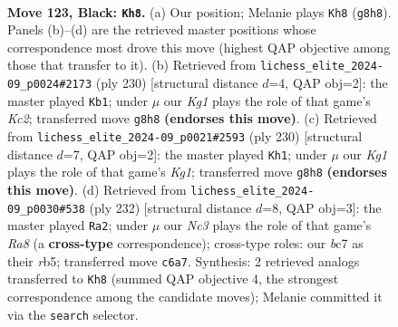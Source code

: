 \documentclass[11pt]{article}
\begin{document}
\clearpage

\begin{figure}[p]\centering
\begin{subfigure}{0.46\textwidth}\centering
\resizebox{\linewidth}{!}{%
\newchessgame
\chessboard[
  setfen={6k1/2B5/2n5/5PK1/8/8/4b3/8 b - - 4 123},
  showmover=false,
  pgfstyle=straightmove, color=movearrow, markmove={g8-h8}
]}
\caption{}
\end{subfigure}\hfill
\begin{subfigure}{0.46\textwidth}\centering
\resizebox{\linewidth}{!}{%
\newchessgame
\chessboard[
  setfen={8/8/8/8/8/b4pk1/2K5/5B2 w - - 0 116},
  showmover=false,
  pgfstyle=straightmove, color=movearrow, markmove={c2-b1}
]}
\caption{}
\end{subfigure}
\\[4pt]
\begin{subfigure}{0.46\textwidth}\centering
\resizebox{\linewidth}{!}{%
\newchessgame
\chessboard[
  setfen={8/8/8/4b3/6kp/8/8/6K1 w - - 30 116},
  showmover=false,
  pgfstyle=straightmove, color=movearrow, markmove={g1-h1}
]}
\caption{}
\end{subfigure}\hfill
\begin{subfigure}{0.46\textwidth}\centering
\resizebox{\linewidth}{!}{%
\newchessgame
\chessboard[
  setfen={R7/8/8/1r6/4K1k1/7p/7B/8 w - - 24 117},
  showmover=false,
  pgfstyle=straightmove, color=movearrow, markmove={a8-a2}
]}
\caption{}
\end{subfigure}
\caption{\textbf{Move 123, Black: \texttt{Kh8}.} (a) Our position; Melanie plays \texttt{Kh8} (\texttt{g8h8}). Panels (b)--(d) are the retrieved master positions whose correspondence most drove this move (highest QAP objective among those that transfer to it). (b) Retrieved from \texttt{lichess\_elite\_2024-09\_p0024\#2173} (ply 230) [structural distance $d$=4, QAP obj=2]: the master played \texttt{Kb1}; under $\mu$ our \emph{Kg1} plays the role of that game's \emph{Kc2}; transferred move \texttt{g8h8} \textbf{(endorses this move)}. (c) Retrieved from \texttt{lichess\_elite\_2024-09\_p0021\#2593} (ply 230) [structural distance $d$=7, QAP obj=2]: the master played \texttt{Kh1}; under $\mu$ our \emph{Kg1} plays the role of that game's \emph{Kg1}; transferred move \texttt{g8h8} \textbf{(endorses this move)}. (d) Retrieved from \texttt{lichess\_elite\_2024-09\_p0030\#538} (ply 232) [structural distance $d$=8, QAP obj=3]: the master played \texttt{Ra2}; under $\mu$ our \emph{Nc3} plays the role of that game's \emph{Ra8} (a \textbf{cross-type} correspondence); cross-type roles: our \emph{b}c7 as their \emph{r}b5; transferred move \texttt{c6a7}. Synthesis: 2 retrieved analogs transferred to \texttt{Kh8} (summed QAP objective 4, the strongest correspondence among the candidate moves); Melanie committed it via the \texttt{search} selector.}
\label{fig:thought-m245}
\end{figure}
\end{document}
